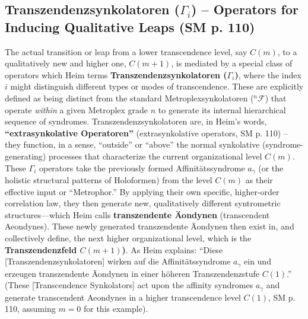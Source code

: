 \documentclass[
    12pt,              %
    a4paper,           %
    headings=normal,   %
    twoside=true,      %
    BCOR=8mm,          %
]{scrbook}
\newcommand{\q}[1]{\enquote{#1}}
\newcommand{\conceptualsyndrome}{a}
\newcommand{\metroplexsynkolator}[1]{{}^{#1}\mathcal{F}}
\newcommand{\transzendenzstufe}[1]{C(#1)}
\newcommand{\transzendenzsynkolator}{\Gamma_i}
\begin{document}
\subsection{Transzendenzsynkolatoren (\(\transzendenzsynkolator\)) – Operators for Inducing Qualitative Leaps (SM p. 110)}
\label{sec:ch6_transzendenzsynkolatoren}
The actual transition or leap from a lower transcendence level, say \(\transzendenzstufe{m}\), to a qualitatively new and higher one, \(\transzendenzstufe{m+1}\), is mediated by a special class of operators which Heim terms \textbf{Transzendenzsynkolatoren (\(\transzendenzsynkolator\))}, where the index \(i\) might distinguish different types or modes of transcendence. These are explicitly defined as being distinct from the standard Metroplexsynkolatoren (\(\metroplexsynkolator{n}\)) that operate \textit{within} a given Metroplex grade \(n\) to generate its internal hierarchical sequence of syndromes. Transzendenzsynkolatoren are, in Heim's words, \textbf{\q{extrasynkolative Operatoren}} (extrasynkolative operators, SM p. 110) – they function, in a sense, \q{outside} or \q{above} the normal synkolative (syndrome-generating) processes that characterize the current organizational level \(\transzendenzstufe{m}\).
These \(\transzendenzsynkolator\) operators take the previously formed Affinitätssyndrome \(\conceptualsyndrome_\gamma\) (or the holistic structural patterns of Holoformen) from the level \(\transzendenzstufe{m}\) as their effective input or \q{Metrophor.} By applying their own specific, higher-order correlation law, they then generate new, qualitatively different syntrometric structures—which Heim calls \textbf{transzendente Äondynen} (transcendent Aeondynes). These newly generated transzendente Äondynen then exist in, and collectively define, the next higher organizational level, which is the \textbf{Transzendenzfeld \( \transzendenzstufe{m+1} \))}. As Heim explains: \q{Diese [Transzendenzsynkolatoren] wirken auf die Affinitätssyndrome \( \conceptualsyndrome_\gamma \) ein und erzeugen transzendente Äondynen in einer höheren Transzendenzstufe \( C(1) \).} (These [Transcendence Synkolators] act upon the affinity syndromes \( \conceptualsyndrome_\gamma \) and generate transcendent Aeondynes in a higher transcendence level \( C(1) \), SM p. 110, assuming \(m=0\) for this example).
\end{document}
